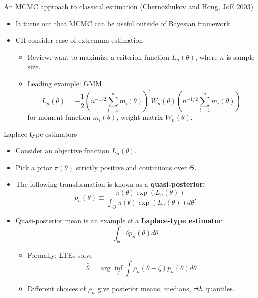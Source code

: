 \documentclass[aspectratio=169]{beamer}
\begin{document}
\begin{frame}{An MCMC approach to classical estimation (Chernozhukov and Hong, JoE
2003)}
\begin{itemize}
\item It turns out that MCMC can be useful outside of Bayesian framework.
\item CH consider case of extremum estimation
\begin{itemize}
\item Review: want to maximize a criterion function $L_{n}(\theta)$, where
$n$ is sample size. 
\item Leading example: GMM 
\[
L_{n}(\theta)=-\frac{1}{2}\left(n^{-1/2}\sum_{i=1}^{n}m_{i}(\theta)\right)^{'}W_{n}(\theta)\left(n^{-1/2}\sum_{i=1}^{n}m_{i}(\theta)\right)
\]
 for moment function $m_{i}(\theta)$, weight matrix $W_{n}(\theta).$ 
\end{itemize}
\end{itemize}
\end{frame}
%
\begin{frame}{Laplace-type estimators}
\begin{itemize}
\item Consider an objective function $L_{n}(\theta)$.
\item Pick a prior $\pi(\theta)$ strictly positive and continuous over
$\Theta.$ 
\item The following transformation is known as a\textbf{ quasi-posterior:}
\[
p_{n}(\theta)\equiv\frac{\pi(\theta)\exp(L_{n}(\theta))}{\int_{\Theta}\pi(\theta)\exp(L_{n}(\theta))d\theta}.
\]
\item Quasi-posterior mean is an example of a \textbf{Laplace-type estimator}:
\[
\int_{\Theta}\theta p_{n}(\theta)d\theta
\]

\begin{itemize}
\item Formally: LTEs solve
\[
\hat{\theta}=\arg\inf_{\zeta}\int\rho_{n}(\theta-\zeta)p_{n}(\theta)d\theta
\]
\item Different choices of $\rho_{n}$ give posterior means, medians, $\tau th$
quantiles.
\end{itemize}
\end{itemize}
\end{frame}
%
\end{document}
